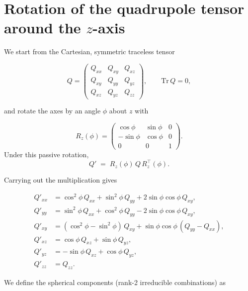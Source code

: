 \setchapterpreamble[u]{\margintoc}
\chapter[Rotation of the quadrupole tensor around the z-axis]{Rotation of the quadrupole tensor around the $z$-axis}
\label{app:rotations_quadrupole}

We start from the Cartesian, symmetric traceless tensor

\begin{equation}
Q=\begin{pmatrix}
Q_{xx} & Q_{xy} & Q_{xz}\\
Q_{xy} & Q_{yy} & Q_{yz}\\
Q_{xz} & Q_{yz} & Q_{zz}
\end{pmatrix},\qquad \mathrm{Tr}\,Q=0,
\end{equation}

and rotate the axes by an angle $\phi$ about $z$ with

\begin{equation}
R_z(\phi)=
\begin{pmatrix}
\cos\phi & \sin\phi & 0\\
-\sin\phi & \cos\phi & 0\\
0 & 0 & 1
\end{pmatrix}.
\end{equation}
Under this passive rotation,
\begin{equation}
Q' \;=\; R_z(\phi)\,Q\,R_z^\top(\phi).
\end{equation}

Carrying out the multiplication gives

\begin{equation}
\begin{aligned}
Q'_{xx} &= \cos^2\!\phi\,Q_{xx}+\sin^2\!\phi\,Q_{yy}+2\sin\phi\cos\phi\,Q_{xy},\\
Q'_{yy} &= \sin^2\!\phi\,Q_{xx}+\cos^2\!\phi\,Q_{yy}-2\sin\phi\cos\phi\,Q_{xy},\\
Q'_{xy} &= (\cos^2\!\phi-\sin^2\!\phi)\,Q_{xy}+\sin\phi\cos\phi\,(Q_{yy}-Q_{xx}),\\
Q'_{xz} &= \cos\phi\,Q_{xz}+\sin\phi\,Q_{yz},\\
Q'_{yz} &= -\sin\phi\,Q_{xz}+\cos\phi\,Q_{yz},\\
Q'_{zz} &= Q_{zz}.
\end{aligned}
\label{eq:Qprime-cart}
\end{equation}

We define the spherical components (rank-2 irreducible combinations) as

